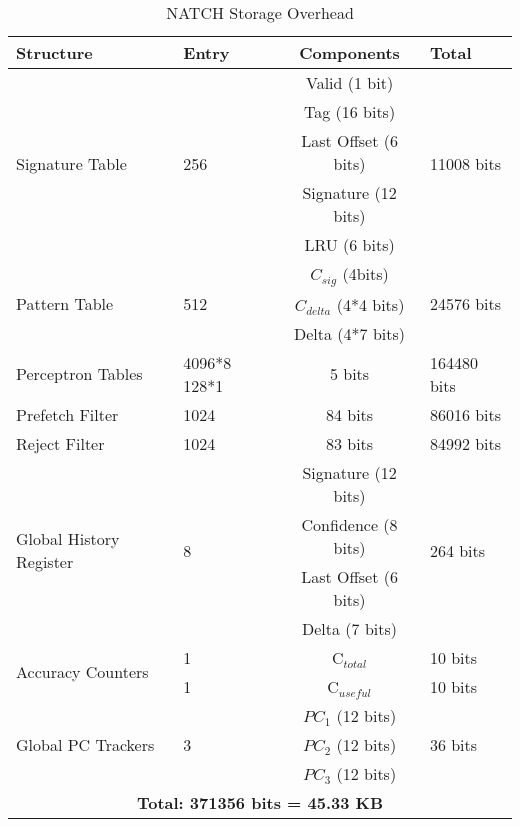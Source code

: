 \begin{table}[]
    \centering
    \begin{tabular}{|p{1.5cm}|p{1cm}|c|p{1.5cm}|}
    \hline
        \textbf{Structure} &
        \textbf{Entry} &
        \textbf{Components} &
        \textbf{Total} \\
    \hline
        \multirow{5}{1.5cm}{Signature Table} & \multirow{5}{1.5cm}{256} & Valid (1 bit) & \multirow{5}{1cm}{11008  bits}\\
        & & Tag (16 bits) &\\
        & & Last Offset (6 bits) &\\  
        & & Signature (12 bits) &\\
        & & LRU (6 bits) &\\
    \hline
        \multirow{3}{1.5cm}{Pattern Table} & \multirow{3}{1.5cm}{512} & $C_{sig}$ (4bits) &\multirow{3}{1cm}{24576 bits}\\
        & & $C_{delta}$ (4*4 bits) &\\
        & & Delta (4*7 bits) &\\
    \hline
        \multirow{3}{1.5cm}{Perceptron Tables} & \multirow{3}{1.5cm}{4096*8 128*1} & \multirow{3}{1.5cm}{5 bits} & \multirow{3}{1.5cm}{164480 bits}\\
        & & &\\
        & & &\\
    \hline
        \multirow{2}{1.5cm}{Prefetch Filter \footnotemark[1]} & \multirow{2}{1.5cm}{1024} & \multirow{2}{1.5cm}{84 bits} & \multirow{2}{1.5cm}{86016 bits}\\
        & & &\\
    \hline
     \multirow{2}{1.5cm}{Reject Filter \footnotemark[2]} & \multirow{2}{1.5cm}{1024} & \multirow{2}{1.5cm}{83 bits} & \multirow{2}{1.5cm}{84992 bits}\\
        & & &\\
    \hline
        \multirow{4}{1.5cm}{Global History Register} & \multirow{4}{1.5cm}{8} & Signature (12 bits) & \multirow{4}{1.5cm}{264 bits}\\
        & & Confidence (8 bits) & \\
        & & Last Offset (6 bits) & \\
        & & Delta (7 bits) & \\
    \hline
        \multirow{2}{1.5cm}{Accuracy Counters} & 1 & C$_{total}$ & 10 bits\\
        & 1 & C$_{useful}$ & 10 bits\\
    \hline
        \multirow{3}{1.5cm}{Global PC Trackers} & \multirow{3}{1cm}{3} & $PC_1$ (12 bits)& \multirow{3}{1.cm}{36 bits}\\
        & & $PC_2$ (12 bits) &\\
        & & $PC_3$ (12 bits) &\\
    \hline
        \multicolumn{4}{|c|}{\textbf{Total: 371356 bits = 45.33 KB}}\\
    \hline
    \end{tabular}
    \caption{NATCH Storage Overhead}
    \label{tab:NATCH_overhead}
\end{table}
